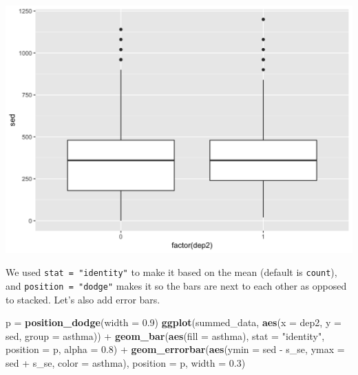 \documentclass[]{tufte-book}
\newenvironment{Shaded}{}{}
\newcommand{\KeywordTok}[1]{\textcolor[rgb]{0.00,0.44,0.13}{\textbf{#1}}}
\newcommand{\DataTypeTok}[1]{\textcolor[rgb]{0.56,0.13,0.00}{#1}}
\newcommand{\FloatTok}[1]{\textcolor[rgb]{0.25,0.63,0.44}{#1}}
\newcommand{\StringTok}[1]{\textcolor[rgb]{0.25,0.44,0.63}{#1}}
\newcommand{\OperatorTok}[1]{\textcolor[rgb]{0.40,0.40,0.40}{#1}}
\newcommand{\NormalTok}[1]{#1}
\theoremstyle{definition}
\theoremstyle{definition}
\theoremstyle{remark}
\begin{document}
\includegraphics{_main_files/figure-latex/unnamed-chunk-138-1}

We used \texttt{stat\ =\ "identity"} to make it based on the mean
(default is \texttt{count}), and \texttt{position\ =\ "dodge"} makes it
so the bars are next to each other as opposed to stacked. Let's also add
error bars.

\begin{Shaded}
\begin{Highlighting}[]
\NormalTok{p =}\StringTok{ }\KeywordTok{position_dodge}\NormalTok{(}\DataTypeTok{width =} \FloatTok{0.9}\NormalTok{)}
\KeywordTok{ggplot}\NormalTok{(summed_data, }\KeywordTok{aes}\NormalTok{(}\DataTypeTok{x =}\NormalTok{ dep2, }\DataTypeTok{y =}\NormalTok{ sed, }\DataTypeTok{group =}\NormalTok{ asthma)) }\OperatorTok{+}\StringTok{ }
\StringTok{    }\KeywordTok{geom_bar}\NormalTok{(}\KeywordTok{aes}\NormalTok{(}\DataTypeTok{fill =}\NormalTok{ asthma), }\DataTypeTok{stat =} \StringTok{"identity"}\NormalTok{, }
        \DataTypeTok{position =}\NormalTok{ p, }\DataTypeTok{alpha =} \FloatTok{0.8}\NormalTok{) }\OperatorTok{+}\StringTok{ }\KeywordTok{geom_errorbar}\NormalTok{(}\KeywordTok{aes}\NormalTok{(}\DataTypeTok{ymin =}\NormalTok{ sed }\OperatorTok{-}\StringTok{ }
\StringTok{    }\NormalTok{s_se, }\DataTypeTok{ymax =}\NormalTok{ sed }\OperatorTok{+}\StringTok{ }\NormalTok{s_se, }\DataTypeTok{color =}\NormalTok{ asthma), }
    \DataTypeTok{position =}\NormalTok{ p, }\DataTypeTok{width =} \FloatTok{0.3}\NormalTok{)}
\end{Highlighting}
\end{Shaded}
\end{document}
